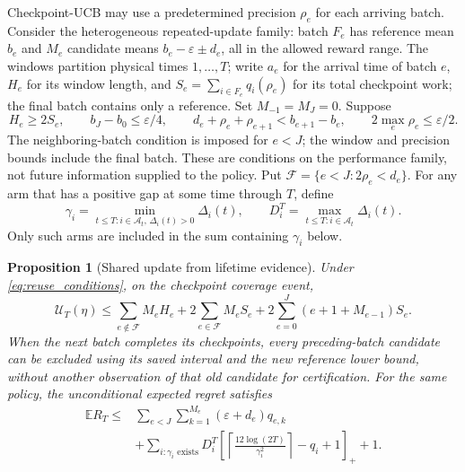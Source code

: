 \documentclass[11pt]{article}
\newtheorem{proposition}[theorem]{Proposition}
\theoremstyle{remark}
\newcommand{\E}{\mathbb E}
\begin{document}
Checkpoint-UCB may use a predetermined precision $\rho_e$ for each arriving
batch. Consider the heterogeneous repeated-update family: batch $F_e$ has
reference mean $b_e$ and $M_e$ candidate means
$b_e-\varepsilon\pm d_e$, all in the allowed reward range. The windows
partition physical times $1,\ldots,T$; write $a_e$ for the arrival time of
batch $e$, $H_e$ for its window length, and
$S_e=\sum_{i\in F_e}q_i(\rho_e)$ for its total checkpoint work; the final
batch contains only a reference. Set $M_{-1}=M_J=0$. Suppose
\begin{equation}
 H_e\ge2S_e,\qquad b_J-b_0\le\varepsilon/4,\qquad
 d_e+\rho_e+\rho_{e+1}<b_{e+1}-b_e,\qquad
 2\max_e\rho_e\le\varepsilon/2.
 \label{eq:reuse_conditions}
\end{equation}
The neighboring-batch condition is imposed for $e<J$; the window and
precision bounds include the final batch. These are conditions on the
performance family, not future information supplied to the policy. Put
$\mathcal F=\{e<J:2\rho_e<d_e\}$. For any arm that has a positive gap at
some time through $T$, define
\[
 \gamma_i=\min_{t\le T:i\in\mathcal A_t,\,\Delta_i(t)>0}\Delta_i(t),
 \qquad
 D_i^T=\max_{t\le T:i\in\mathcal A_t}\Delta_i(t).
\]
Only such arms are included in the sum containing $\gamma_i$ below.

\begin{proposition}[Shared update from lifetime evidence]
\label{thm:reuse}
Under \eqref{eq:reuse_conditions}, on the checkpoint coverage event,
\begin{equation}
 \mathcal U_T(\eta)\le
 \sum_{e\notin\mathcal F}M_eH_e+
 2\sum_{e\in\mathcal F}M_eS_e+
 2\sum_{e=0}^J(e+1+M_{e-1})S_e.
 \label{eq:reuse_area}
\end{equation}
When the next batch completes its checkpoints, every preceding-batch candidate
can be excluded using its saved interval and the new reference lower bound,
without another observation of that old candidate for certification.
For the same policy, the unconditional expected regret satisfies
\begin{equation}
 \begin{aligned}
 \E R_T\le{}&\sum_{e<J}\sum_{k=1}^{M_e}(\varepsilon+d_e)q_{e,k}\\
 &+\sum_{i:\gamma_i\text{ exists}}D_i^T
 \left[\left\lceil\frac{12\log(2T)}{\gamma_i^2}\right\rceil-q_i+1\right]_+
 +1.
 \end{aligned}
 \label{eq:reuse_regret}
\end{equation}
\end{proposition}
\end{document}
